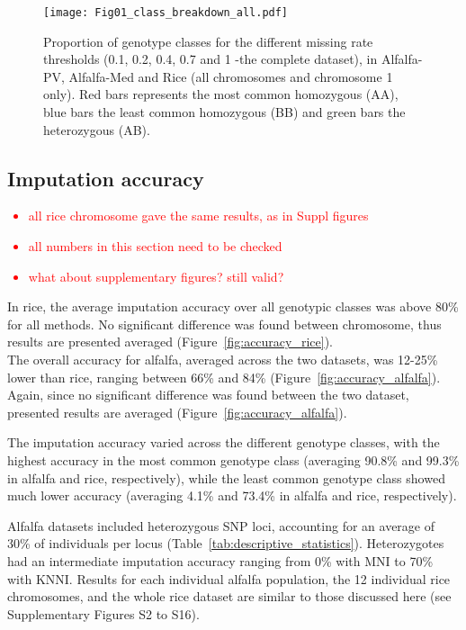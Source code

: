 \begin{figure}
\texttt{[image: Fig01\_class\_breakdown\_all.pdf]}
\caption[Proportions of genotype classes]{​Proportion of genotype classes for the different missing rate thresholds (0.1, 0.2, 0.4, 0.7 and 1 -the complete dataset), in Alfalfa-PV, Alfalfa-Med and Rice (all chromosomes and chromosome 1 only). Red bars represents the most common homozygous (AA), blue bars the least common homozygous (BB) and green bars the heterozygous (AB).}
\label{fig:genotype_classes}
\end{figure}

\subsection{Imputation accuracy}
\label{sec:imputation_accuracy}  
\textcolor{red}{
\begin{itemize}
  \item all rice chromosome gave the same results, as in Suppl figures
  \item all numbers in this section need to be checked
  \item what about supplementary figures? still valid?
\end{itemize}
}
In rice, the average imputation accuracy over all genotypic classes was above 80\% for all methods. No significant difference was found between chromosome, thus results are presented averaged (Figure~\ref{fig:accuracy_rice}). \\
The overall accuracy for alfalfa, averaged across the two datasets, was 12-25\% lower than rice, ranging between 66\% and 84\% (Figure~\ref{fig:accuracy_alfalfa}). Again, since no significant difference was found between the two dataset, presented results are averaged (Figure~\ref{fig:accuracy_alfalfa}).

The imputation accuracy varied across the different genotype classes, with the highest accuracy in the most common genotype class (averaging 90.8\% and 99.3\% in alfalfa and rice, respectively), while the least common genotype class showed much lower accuracy (averaging 4.1\% and 73.4\% in alfalfa and rice, respectively).

Alfalfa datasets included heterozygous SNP loci, accounting for an average of 30\% of individuals per locus (Table~\ref{tab:descriptive_statistics}). Heterozygotes had an intermediate imputation accuracy ranging from 0\% with MNI to 70\% with KNNI. Results for each individual alfalfa population, the 12 individual rice chromosomes, and the whole rice dataset are similar to those discussed here (see Supplementary Figures S2 to S16). 

